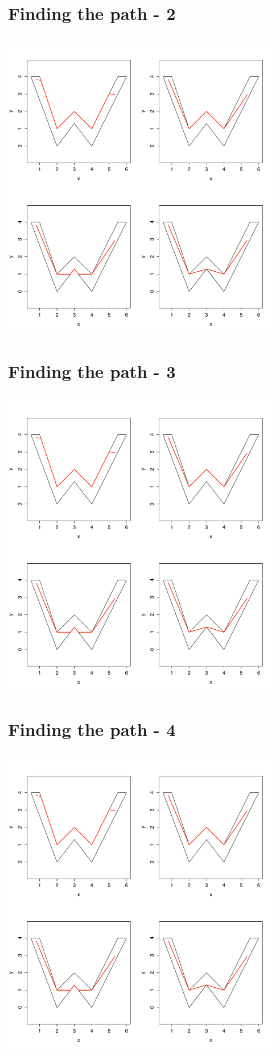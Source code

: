 \documentclass[ignorenonframetext]{beamer} %
\begin{document}
\begin{frame}
	\frametitle{Finding the path - 2}
            \centering
              \includegraphics[width=2.75in]{figs/wood-1}\\
\end{frame}

\begin{frame}
	\frametitle{Finding the path - 3}
            \centering
              \includegraphics[width=2.75in]{figs/wood-3}\\
\end{frame}

\begin{frame}
	\frametitle{Finding the path - 4}
            \centering
              \includegraphics[width=2.75in]{figs/wood-4}\\
\end{frame}
\end{document}
